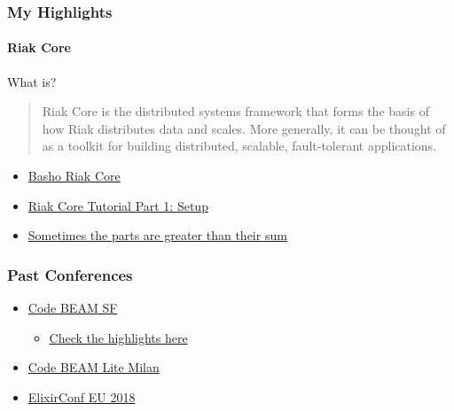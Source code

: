 \documentclass{beamer}
\begin{document}
  \begin{frame}
    \frametitle{My Highlights}
    \framesubtitle{Riak Core}

    \begin{block}{What is?}   
    \begin{quote}
    Riak Core is the distributed systems framework that forms the basis of how Riak distributes data and scales. More generally, it can be thought of as a toolkit for building distributed, scalable, fault-tolerant applications.        
    \end{quote}
    \end{block}
    
    \pause
    
    \begin{block}{}
    \begin{itemize}
      \item \href{https://github.com/basho/riak_core}{Basho Riak Core}
      \item \href{http://marianoguerra.org/posts/riak-core-tutorial-part-1-setup.html}{Riak Core Tutorial Part 1: Setup}
      \item \href{https://www.youtube.com/watch?v=1qyjAU81Qhg}{Sometimes the parts are greater than their sum}
    \end{itemize}

    \end{block}
    
  \end{frame}

  \begin{frame}
    \frametitle{Past Conferences}
    
    \begin{itemize}
      \item \href{https://codesync.global/conferences/code-beam-sf-2018}{Code BEAM SF}
      \begin{itemize}
      \item \href{https://www.erlang-solutions.com/blog/elixirconf-eu-2018-highlights.html}{Check the highlights here}
      \end{itemize}
      \item \href{https://codesync.global/conferences/code-beam-lite-milan-2018}{Code BEAM Lite Milan}
      \item \href{https://www.erlang-solutions.com/blog/elixirconf-eu-2018-highlights.html}{ElixirConf EU 2018}
    \end{itemize}
  \end{frame}
  
\end{document}
